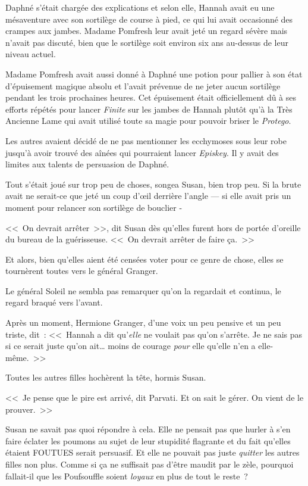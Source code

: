 Daphné s'était chargée des explications et selon elle, Hannah avait eu une mésaventure avec son sortilège de course à pied, ce qui lui avait occasionné des crampes aux jambes. Madame Pomfresh leur avait jeté un regard sévère mais n'avait pas discuté, bien que le sortilège soit environ six ans au-dessus de leur niveau actuel.

Madame Pomfresh avait aussi donné à Daphné une potion pour pallier à son état d'épuisement magique absolu et l'avait prévenue de ne jeter aucun sortilège pendant les trois prochaines heures. Cet épuisement était officiellement dû à ses efforts répétés pour lancer \emph{Finite} sur les jambes de Hannah plutôt qu'à la Très Ancienne Lame qui avait utilisé toute sa magie pour pouvoir briser le \emph{Protego}.

Les autres avaient décidé de ne pas mentionner les ecchymoses sous leur robe jusqu'à avoir trouvé des aînées qui pourraient lancer \emph{Episkey}. Il y avait des limites aux talents de persuasion de Daphné.

Tout s'était joué sur trop peu de choses, songea Susan, bien trop peu. Si la brute avait ne serait-ce que jeté un coup d'œil derrière l'angle — si elle avait pris un moment pour relancer son sortilège de bouclier -

<<~On devrait arrêter~>>, dit Susan dès qu'elles furent hors de portée d'oreille du bureau de la guérisseuse. <<~On devrait arrêter de faire ça.~>>

Et alors, bien qu'elles aient été censées voter pour ce genre de chose, elles se tournèrent toutes vers le général Granger.

Le général Soleil ne sembla pas remarquer qu'on la regardait et continua, le regard braqué vers l'avant.

Après un moment, Hermione Granger, d'une voix un peu pensive et un peu triste, dit~: <<~Hannah a dit qu'\emph{elle} ne voulait pas qu'on s'arrête. Je ne sais pas si ce serait juste qu'on ait… moins de courage \emph{pour} elle qu'elle n'en a elle-même.~>>

Toutes les autres filles hochèrent la tête, hormis Susan.

<<~Je pense que le pire est arrivé, dit Parvati. Et on sait le gérer. On vient de le prouver.~>>

Susan ne savait pas quoi répondre à cela. Elle ne pensait pas que hurler à s'en faire éclater les poumons au sujet de leur stupidité flagrante et du fait qu'elles étaient FOUTUES serait persuasif. Et elle ne pouvait pas juste \emph{quitter} les autres filles non plus. Comme si ça ne suffisait pas d'être maudit par le zèle, pourquoi fallait-il que les Poufsouffle soient \emph{loyaux} en plus de tout le reste~?

